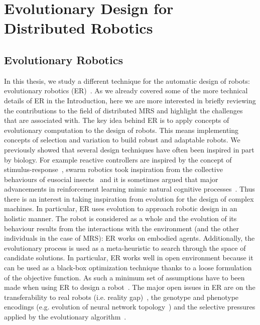
\section{Evolutionary Design for Distributed Robotics}

  \subsection{Evolutionary Robotics} %

    In this thesis, we study a different technique for the automatic design of robots: evolutionary robotics (ER)~\parencite{Nolfi2000, Doncieux2015a}. As we already covered some of the more technical details of ER in the Introduction, here we are more interested in briefly reviewing the contributions to the field of distributed MRS and highlight the challenges that are associated with. The key idea behind ER is to apply concepts of evolutionary computation to the design of robots. This means implementing concepts of selection and variation to build robust and adaptable robots. We previously showed that several design techniques have often been inspired in part by biology. For example reactive controllers are inspired by the concept of stimulus-response~\parencite{Brooks1986}, swarm robotics took inspiration from the collective behaviours of eusocial insects~\parencite{Bonabeau1999} and it is sometimes argued that major advancements in reinforcement learning mimic natural cognitive processes~\parencite{Montague1996}. Thus there is an interest in taking inspiration from evolution for the design of complex machines. In particular, ER uses evolution to approach robotic design in an holistic manner. The robot is considered as a whole and the evolution of its behaviour results from the interactions with the environment (and the other individuals in the case of MRS): ER works on embodied agents. Additionally, the evolutionary process is used as a meta-heuristic to search through the space of candidate solutions. In particular, ER works well in open environment because it can be used as a black-box optimization technique thanks to a loose formulation of the objective function. As such a minimum set of assumptions have to been made when using ER to design a robot~\parencite{Bongard2013a}. The major open issues in ER are on the transferability to real robots (i.e. reality gap)~\parencite{Mouret2012b, Cully2015}, the genotype and phenotype encodings (e.g. evolution of neural network topology~\parencite{Stanley2002}) and the selective pressures applied by the evolutionary algorithm~\parencite{Lehman2011, Mouret2012a}.

